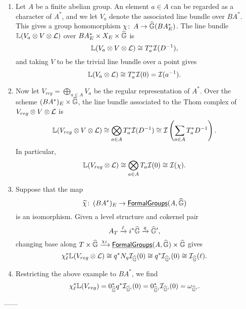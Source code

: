 \begin{enumerate}
\item Let $A$ be a finite abelian group.  An element $a \in A$ can be regarded as a character of $A^*$, and we let $V_a$ denote the associated line bundle over $BA^*$.  This gives a group homomorphism $\chi\colon\thinspace A \to \widehat{\mathbb G}(BA^*_E)$.  The line bundle $\mathbb{L}(V_a \otimes V \otimes \mathcal{L})$ over $BA^*_E \times X_E \times \widehat{\mathbb G}$ is \[\mathbb{L}(V_a \otimes V \otimes \mathcal{L}) \cong T_a^* \mathcal{I}(D^{-1}),\] and taking $V$ to be the trivial line bundle over a point gives \[\mathbb{L}(V_a \otimes \mathcal{L}) \cong T_a^* \mathcal{I}(0) = \mathcal{I}(a^{-1}).\]
\item Now let $V_{reg} = \bigoplus_{a \in A} V_a$ be the regular representation of $A^*$.  Over the scheme $(BA^*)_E \times \widehat{\mathbb G}$, the line bundle associated to the Thom complex of $V_{reg} \otimes V \otimes \mathcal{L}$ is \[\mathbb{L}(V_{reg} \otimes V \otimes \mathcal{L}) \cong \bigotimes_{a \in A} T_a^* \mathcal{I}(D^{-1}) \cong \mathcal{I} \left( \sum_{a \in A} T_a^* D^{-1} \right).\]  In particular, \[\mathbb{L}(V_{reg} \otimes \mathcal{L}) \cong \bigotimes_{a \in A} T_a \mathcal{I}(0) \cong \mathcal{I}(\chi).\]
\item Suppose that the map \[\widetilde \chi\colon\thinspace (BA^*)_E \to \operatorname{\underline{\smash{\mathsf{FormalGroups}}}}(A, \widehat{\mathbb G})\] is an isomorphism.  Given a level structure and cokernel pair \[A_T \xrightarrow{\ell} i^* \widehat{\mathbb G} \xrightarrow{q} \widehat{\mathbb G}',\] changing base along $T \times \widehat{\mathbb G} \xrightarrow{\chi_\ell} \operatorname{\underline{\smash{\mathsf{FormalGroups}}}}(A, \widehat{\mathbb G}) \times \widehat{\mathbb G}$ gives \[\chi_\ell^* \mathbb{L}(V_{reg} \otimes \mathcal{L}) \cong q^* N_q \mathcal{I}_{\widehat{\mathbb G}}(0) \cong q^* \mathcal{I}_{\widehat{\mathbb G}'}(0) \cong \mathcal{I}_{\widehat{\mathbb G}}(\ell).\]
\item Restricting the above example to $BA^*$, we find \[\chi_\ell^* \mathbb{L}(V_{reg}) = 0_{\widehat{\mathbb G}}^* q^* \mathcal{I}_{\widehat{\mathbb G}'}(0) = 0_{\widehat{\mathbb G}'}^* \mathcal{I}_{\widehat{\mathbb G}'}(0) = \omega_{\widehat{\mathbb G}'}.\]
\end{enumerate}


------


